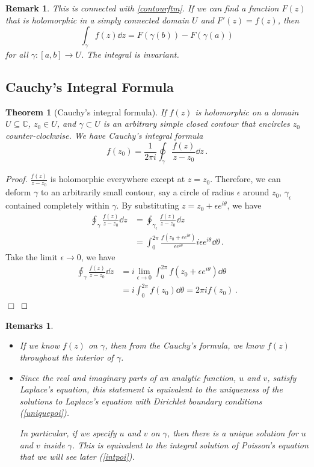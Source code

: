 \documentclass{article}
\theoremstyle{plain}\theoremheaderfont{\normalfont\itshape}\theorembodyfont{\rmfamily}\theoremseparator{.}\newtheorem*{rem}{Remark}\newtheorem*{ex}{Example}\newtheorem*{proof}{Proof}\newtheorem*{altp}{Alternative proof}
\theoremstyle{plain}\theoremheaderfont{\normalfont\bfseries}\theorembodyfont{\rmfamily}\theoremseparator{.}\newtheorem{thm}{Theorem}[section]\newtheorem{lem}[thm]{Lemma}\newtheorem{prop}[thm]{Proposition}\newtheorem*{cor}{Corollary}\newtheorem{defn}[thm]{Definition}\newtheorem{clm}[thm]{Claim}\newtheorem{clminproof}{Claim}
\theoremstyle{break}\theoremheaderfont{\normalfont\itshape}\theorembodyfont{\rmfamily}\theoremseparator{.\medskip}\newtheorem*{proofskip}{Proof}\newtheorem*{exs}{Examples}\newtheorem*{rems}{Remarks}
\theoremstyle{break}\theoremheaderfont{\normalfont\bfseries}\theorembodyfont{\rmfamily}\theoremseparator{.\medskip}\newtheorem{lemskip}[thm]{Lemma}\newtheorem{defnskip}[thm]{Definition}\newtheorem{propskip}[thm]{Proposition}\newtheorem{thmskip}[thm]{Theorem}
\numberwithin{equation}{section}
\newcommand{\qed}{\hfill\ensuremath{\Box}}
\begin{document}
	\begin{rem}
		This is connected with \cref{contourftm}. If we can find a function \(F(z)\) that is holomorphic in a simply connected domain \(U\) and \(F'(z)=f(z)\), then
		\[\int_{\gamma}f(z)\dd{z}=F(\gamma(b))-F(\gamma(a))\]
		for all \(\gamma:[a,b]\to U\). The integral is invariant.
	\end{rem}
	\subsection{Cauchy's Integral Formula}
	\begin{thm}[Cauchy's integral formula]
		If \(f(z)\) is holomorphic on a domain \(U\subseteq\mathbb{C}\), \(z_0\in U\), and \(\gamma\subset U\) is an arbitrary simple closed contour that encircles \(z_0\) counter-clockwise. We have Cauchy's integral formula
		\[f(z_0)=\frac{1}{2\pi i}\oint_\gamma\frac{f(z)}{z-z_0}\dd{z}\,.\]
	\end{thm}
	\begin{proof}
		\(\frac{f(z)}{z-z_0}\) is holomorphic everywhere except at \(z=z_0\). Therefore, we can deform \(\gamma\) to an arbitrarily small contour, say a circle of radius \(\epsilon\) around \(z_0\), \(\gamma_\epsilon\) contained completely within \(\gamma\). By substituting \(z=z_0+\epsilon e^{i\theta}\), we have
		\begin{align*}
			\oint_\gamma\frac{f(z)}{z-z_0}\dd{z}&=\oint_{\gamma_\epsilon}\frac{f(z)}{z-z_0}\dd{z}\\
			&=\int_{0}^{2\pi}\frac{f(z_0+\epsilon e^{i\theta})}{\epsilon e^{i\theta}}i\epsilon e^{i\theta}\dd{\theta}\,.
		\end{align*}
		Take the limit \(\epsilon\to 0\), we have
		\begin{align*}
			\oint_\gamma\frac{f(z)}{z-z_0}\dd{z}&=i\lim_{\epsilon\to 0}\int_0^{2\pi}f(z_0+\epsilon e^{i\theta})\dd{\theta}\\
			&=i\int_{0}^{2\pi}f(z_0)\dd{\theta}=2\pi if(z_0)\,.
		\end{align*}\qed
	\end{proof}
	\begin{rems}
		\begin{itemize}[topsep=0pt]
			\item If we know \(f(z)\) on \(\gamma\), then from the Cauchy's formula, we know \(f(z)\) throughout the interior of \(\gamma\).
			\item Since the real and imaginary parts of an analytic function, \(u\) and \(v\), satisfy Laplace's equation, this statement is equivalent to the uniqueness of the solutions to Laplace's equation with Dirichlet boundary conditions (\cref{uniquepoi}).
			
			In particular, if we specify \(u\) and \(v\) on \(\gamma\), then there is a unique solution for \(u\) and \(v\) inside \(\gamma\). This is equivalent to the integral solution of Poisson's equation that we will see later (\cref{intpoi}).
		\end{itemize}
	\end{rems}
\end{document}
